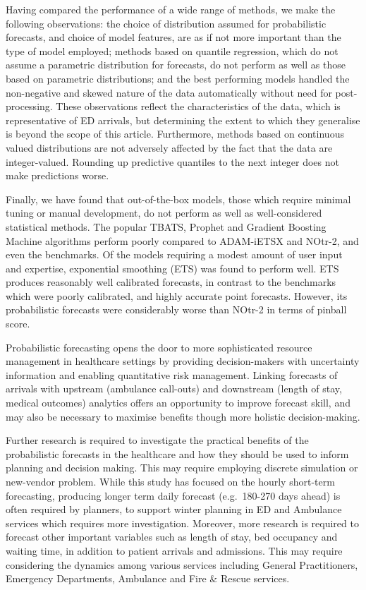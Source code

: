 \documentclass[]{elsarticle} %
\begin{document}
Having compared the performance of a wide range of methods, we make the following observations: the choice of distribution assumed for probabilistic forecasts, and choice of model features, are as if not more important than the type of model employed; methods based on quantile regression, which do not assume a parametric distribution for forecasts, do not perform as well as those based on parametric distributions; and the best performing models handled the non-negative and skewed nature of the data automatically without need for post-processing. These observations reflect the characteristics of the data, which is representative of ED arrivals, but determining the extent to which they generalise is beyond the scope of this article. Furthermore, methods based on continuous valued distributions are not adversely affected by the fact that the data are integer-valued. Rounding up predictive quantiles to the next integer does not make predictions worse.

Finally, we have found that out-of-the-box models, those which require minimal tuning or manual development, do not perform as well as well-considered statistical methods. The popular TBATS, Prophet and Gradient Boosting Machine algorithms perform poorly compared to ADAM-iETSX and NOtr-2, and even the benchmarks. Of the models requiring a modest amount of user input and expertise, exponential smoothing (ETS) was found to perform well. ETS produces reasonably well calibrated forecasts, in contrast to the benchmarks which were poorly calibrated, and highly accurate point forecasts. However, its probabilistic forecasts were considerably worse than NOtr-2 in terms of pinball score.

Probabilistic forecasting opens the door to more sophisticated resource management in healthcare settings by providing decision-makers with uncertainty information and enabling quantitative risk management. Linking forecasts of arrivals with upstream (ambulance call-outs) and downstream (length of stay, medical outcomes) analytics offers an opportunity to improve forecast skill, and may also be necessary to maximise benefits though more holistic decision-making.

Further research is required to investigate the practical benefits of the probabilistic forecasts in the healthcare and how they should be used to inform planning and decision making. This may require employing discrete simulation or new-vendor problem.
While this study has focused on the hourly short-term forecasting, producing longer term daily forecast (e.g.~180-270 days ahead) is often required by planners, to support winter planning in ED and Ambulance services which requires more investigation. Moreover, more research is required to forecast other important variables such as length of stay, bed occupancy and waiting time, in addition to patient arrivals and admissions. This may require considering the dynamics among various services including General Practitioners, Emergency Departments, Ambulance and Fire \& Rescue services.
\end{document}
